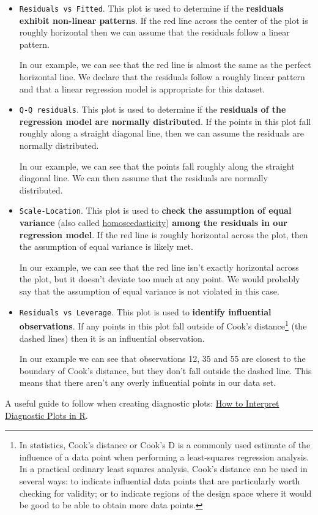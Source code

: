 \documentclass[a4paper]{article}
\begin{document}
    \begin{itemize}
        \item \textcolor{Red3}{\texttt{Residuals vs Fitted}}. This plot is used to determine if the \textbf{residuals exhibit non-linear patterns}. If the red line across the center of the plot is roughly horizontal then we can assume that the residuals follow a linear pattern.
        
        In our example, we can see that the red line is almost the same as the perfect horizontal line. We declare that the residuals follow a roughly linear pattern and that a linear regression model is appropriate for this dataset.

        \item \textcolor{Red3}{\texttt{Q-Q residuals}}. This plot is used to determine if the \textbf{residuals of the regression model are normally distributed}. If the points in this plot fall roughly along a straight diagonal line, then we can assume the residuals are normally distributed.
        
        In our example, we can see that the points fall roughly along the straight diagonal line. We can then assume that the residuals are normally distributed.

        \newpage

        \item \textcolor{Red3}{\texttt{Scale-Location}}. This plot is used to \textbf{check the assumption of equal variance} (also called \href{https://en.wikipedia.org/wiki/Homoscedasticity_and_heteroscedasticity}{homoscedasticity}) \textbf{among the residuals in our regression model}. If the red line is roughly horizontal across the plot, then the assumption of equal variance is likely met.

        In our example, we can see that the red line isn't exactly horizontal across the plot, but it doesn't deviate too much at any point. We would probably say that the assumption of equal variance is not violated in this case.

        \item \textcolor{Red3}{\texttt{Residuals vs Leverage}}. This plot is used to \textbf{identify influential observations}. If any points in this plot fall outside of Cook's distance\footnote{In statistics, Cook's distance or Cook's D is a commonly used estimate of the influence of a data point when performing a least-squares regression analysis. In a practical ordinary least squares analysis, Cook's distance can be used in several ways: to indicate influential data points that are particularly worth checking for validity; or to indicate regions of the design space where it would be good to be able to obtain more data points.} (the dashed lines) then it is an influential observation.

        In our example we can see that observations 12, 35 and 55 are closest to the boundary of Cook's distance, but they don't fall outside the dashed line. This means that there aren't any overly influential points in our data set.
    \end{itemize}
    A useful guide to follow when creating diagnostic plots: \href{https://www.statology.org/diagnostic-plots-in-r/}{How to Interpret Diagnostic Plots in R}.
\end{document}
